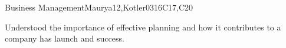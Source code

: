 \begin{syllabus}
\begin{unit}{Business Management}{}{Maurya12,Kotler03}{16}{C17,C20}
\begin{learningoutcomes}
   \item Understood the importance of effective planning and how it contributes to a company has launch and success.
\end{learningoutcomes}
\end{unit}



\begin{coursebibliography}
\end{coursebibliography}

\end{syllabus}
